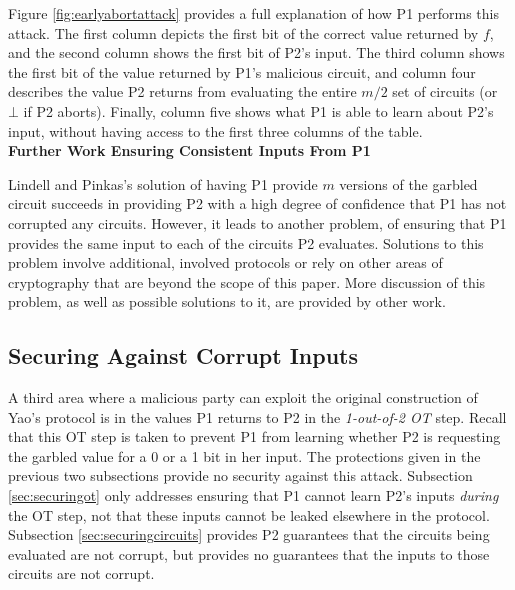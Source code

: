 Figure \ref{fig:earlyabortattack} provides a full explanation of how \ac{P1} performs this attack.  The first column depicts the first bit of the correct value returned by $f$, and the second column shows the first bit of \ac{P2}'s input.  The third column shows the first bit of the value returned by \ac{P1}'s malicious circuit, and column four describes the value \ac{P2} returns from evaluating the entire $m/2$ set of circuits (or $\bot$ if \ac{P2} aborts).  Finally, column five shows what \ac{P1} is able to learn about \ac{P2}'s input, without having access to the first three columns of the table.\\[.5em]


\noindent\textbf{Further Work Ensuring Consistent Inputs From \ac{P1}}

Lindell and Pinkas's\cite{lindell2007efficient} solution of having \ac{P1} provide $m$ versions of the garbled circuit succeeds in providing \ac{P2} with a high degree of confidence that \ac{P1} has not corrupted any circuits.  However, it leads to another problem, of ensuring that \ac{P1} provides the same input to each of the circuits \ac{P2} evaluates.  Solutions to this problem involve additional, involved protocols\cite{lindell2007efficient} or rely on other areas of cryptography\cite{shen2011two} that are beyond the scope of this paper.  More discussion of this problem, as well as possible solutions to it, are provided by other work\cite{kreuter2012billion}.


\subsection{Securing Against Corrupt Inputs}
\label{sub:inputattacks}

A third area where a malicious party can exploit the original construction of Yao's protocol is in the values \ac{P1} returns to \ac{P2} in the \emph{1-out-of-2 \ac{OT}} step.  Recall that this \ac{OT} step is taken to prevent \ac{P1} from learning whether \ac{P2} is requesting the garbled value for a 0 or a 1 bit in her input.  The protections given in the previous two subsections provide no security against this attack. Subsection \ref{sec:securingot} only addresses ensuring that \ac{P1} cannot learn \ac{P2}'s inputs \emph{during} the \ac{OT} step, not that these inputs cannot be leaked elsewhere in the protocol.  Subsection \ref{sec:securingcircuits} provides \ac{P2} guarantees that the circuits being evaluated are not corrupt, but provides no guarantees that the inputs to those circuits are not corrupt.


